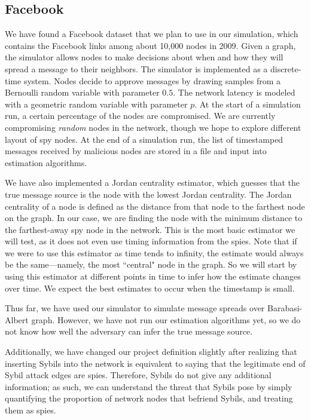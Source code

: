 \subsection{Facebook}

We have found a Facebook dataset  that we plan to use in our simulation, which contains the Facebook links among about 10,000 nodes in 2009. Given a graph, the simulator allows nodes to make decisions about when and how they will spread a message to their neighbors. 
The simulator is implemented as a discrete-time system. Nodes decide to approve messages by drawing samples from a Bernoulli random variable with parameter $0.5$. The network latency is modeled with a geometric random variable with parameter $p$. 
At the start of a simulation run, a certain percentage of the nodes are compromised. We are currently compromising \emph{random} nodes in the network, though we hope to explore different layout of spy nodes. 
At the end of a simulation run, the list of timestamped messages received by malicious nodes are stored in a file and input into estimation algorithms.

We have also implemented a Jordan centrality estimator, which guesses that the true message source is the node with the lowest Jordan centrality. The Jordan centrality of a node is defined as the distance from that node to the farthest node on the graph. In our case, we are finding the node with the minimum distance to the farthest-away spy node in the network. This is the most basic estimator we will test, as it does not even use timing information from the spies. Note that if we were to use this estimator as time tends to infinity, the estimate would always be the same---namely, the most ``central" node in the graph. So we will start by using this estimator at different points in time to infer how the estimate changes over time. We expect the best estimates to occur when the timestamp is small.

Thus far, we have used our simulator to simulate message spreads over Barabasi-Albert graph. However, we have not run our estimation algorithms yet, so we do not know how well the adversary can infer the true message source.

Additionally, we have changed our project definition slightly after realizing that inserting Sybils into the network is equivalent to saying that the legitimate end of Sybil attack edges are spies. Therefore, Sybils do not give any additional information; as such, we can understand the threat that Sybils pose by simply quantifying the proportion of network nodes that befriend Sybils, and treating them as spies. 
